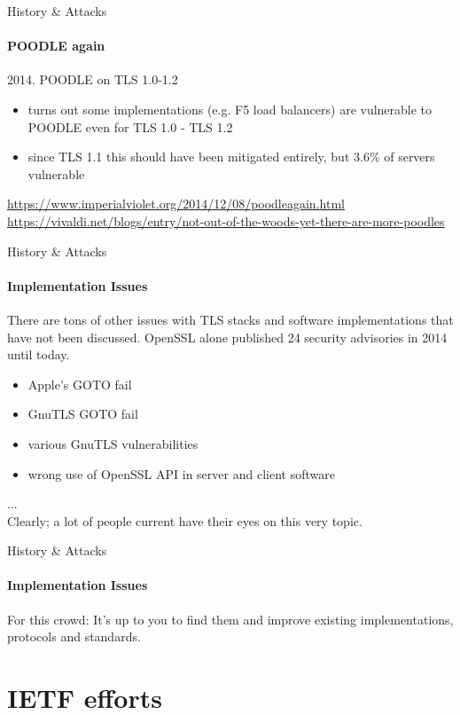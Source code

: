 \documentclass[hyperref={draft}]{beamer}
\begin{document}
\begin{frame}{History \& Attacks}
  \framesubtitle{POODLE again}
  2014. POODLE on TLS 1.0-1.2
  \begin{itemize}
    \item turns out some implementations (e.g. F5 load balancers) are vulnerable to POODLE even for TLS 1.0 - TLS 1.2
    \item since TLS 1.1 this should have been mitigated entirely, but 3.6\% of servers vulnerable
  \end{itemize}

  \vspace{20px}

  \tiny
  \url{https://www.imperialviolet.org/2014/12/08/poodleagain.html}\\
  \url{https://vivaldi.net/blogs/entry/not-out-of-the-woods-yet-there-are-more-poodles}
\end{frame}



\begin{frame}{History \& Attacks}
  \framesubtitle{Implementation Issues}
  There are tons of other issues with TLS stacks and software implementations that have not been discussed.
  \newline
  \newline
  OpenSSL alone published 24 security advisories in 2014 until today.

  \begin{itemize}
    \item Apple's GOTO fail
    \item GnuTLS GOTO fail
    \item various GnuTLS vulnerabilities
    \item wrong use of OpenSSL API in server and client software
  \end{itemize}
  ...\\
  Clearly; a lot of people current have their eyes on this very topic.
\end{frame}

\begin{frame}{History \& Attacks}
  \framesubtitle{Implementation Issues}
  For this crowd: It's up to you to find them and improve existing implementations, protocols and standards.
\end{frame}

\section{IETF efforts}
\end{document}
